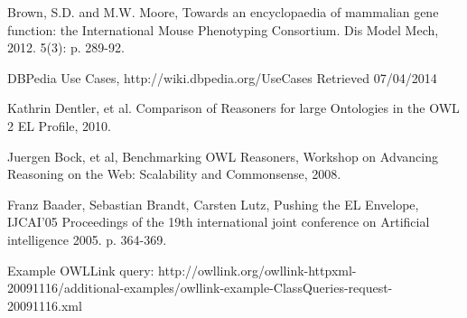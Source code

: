 \documentclass{article}
\begin{document}
\begin{thebibliography}{9}
  Brown, S.D. and M.W. Moore,
  Towards an encyclopaedia of mammalian gene function: the International Mouse Phenotyping Consortium. 
  Dis Model Mech, 
  2012. 5(3): p. 289-92.

  DBPedia Use Cases,
  http://wiki.dbpedia.org/UseCases
  Retrieved 07/04/2014

  Kathrin Dentler, et al.
  Comparison of Reasoners for large Ontologies in the OWL 2 EL Profile,
  2010.

  Juergen Bock, et al,
  Benchmarking OWL Reasoners,
  Workshop on Advancing Reasoning on the Web: Scalability and Commonsense,
  2008.

  Franz Baader, Sebastian Brandt, Carsten Lutz,
  Pushing the EL Envelope,
  IJCAI'05 Proceedings of the 19th international joint conference on Artificial intelligence
  2005. p. 364-369.

Example OWLLink query:
http://owllink.org/owllink-httpxml-20091116/additional-examples/owllink-example-ClassQueries-request-20091116.xml

\end{thebibliography}
\end{document}
